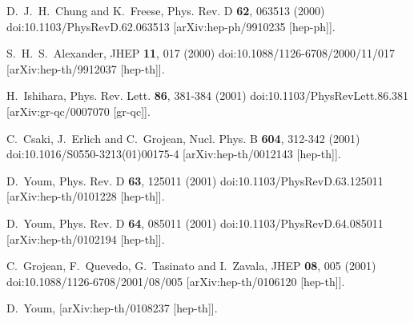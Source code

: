 \documentclass[jkps,preprint,fleqn]{revtex4} %
\begin{document}
\begin{thebibliography}{999}
D.~J.~H.~Chung and K.~Freese,
Phys. Rev. D \textbf{62}, 063513 (2000)
doi:10.1103/PhysRevD.62.063513
[arXiv:hep-ph/9910235 [hep-ph]].

S.~H.~S.~Alexander,
JHEP \textbf{11}, 017 (2000)
doi:10.1088/1126-6708/2000/11/017
[arXiv:hep-th/9912037 [hep-th]].

H.~Ishihara,
Phys. Rev. Lett. \textbf{86}, 381-384 (2001)
doi:10.1103/PhysRevLett.86.381
[arXiv:gr-qc/0007070 [gr-qc]].

C.~Csaki, J.~Erlich and C.~Grojean,
Nucl. Phys. B \textbf{604}, 312-342 (2001)
doi:10.1016/S0550-3213(01)00175-4
[arXiv:hep-th/0012143 [hep-th]].

D.~Youm,
Phys. Rev. D \textbf{63}, 125011 (2001)
doi:10.1103/PhysRevD.63.125011
[arXiv:hep-th/0101228 [hep-th]].

D.~Youm,
Phys. Rev. D \textbf{64}, 085011 (2001)
doi:10.1103/PhysRevD.64.085011
[arXiv:hep-th/0102194 [hep-th]].

C.~Grojean, F.~Quevedo, G.~Tasinato and I.~Zavala,
JHEP \textbf{08}, 005 (2001)
doi:10.1088/1126-6708/2001/08/005
[arXiv:hep-th/0106120 [hep-th]].

D.~Youm,
[arXiv:hep-th/0108237 [hep-th]].





\end{thebibliography}
\end{document}
